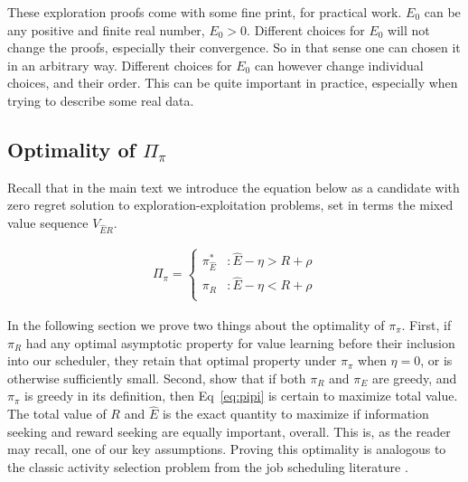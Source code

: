 These exploration proofs come with some fine print, for practical work. $E_0$ can be any positive and finite real number, $E_0 > 0$. Different choices for $E_0$ will not change the proofs, especially their convergence. So in that sense one can chosen it in an arbitrary way. Different choices for $E_0$ can however change individual choices, and their order. This can be quite important in practice, especially when trying to describe some real data.  

\subsection*{Optimality of $\Pi_{\pi}$} 
Recall that in the main text we introduce the equation below as a candidate with zero regret solution to exploration-exploitation problems, set in terms the mixed value sequence $V_{\hat{E}R}$.

\begin{equation} 
    \label{eq:pipi_app}
    \begin{split}
        \Pi_{\pi} = 
        \begin{cases}
            \pi^*_{\hat{E}} & : \hat{E} - \eta > R + \rho \\
            \pi_R 	& : \hat{E} - \eta < R + \rho \\
        \end{cases}
    \end{split}
\end{equation}

In the following section we prove two things about the optimality of $\pi_\pi$. First, if $\pi_R$ had any optimal asymptotic property for value learning before their inclusion into our scheduler, they retain that optimal property under $\pi_\pi$ when $\eta = 0$, or is otherwise sufficiently small. Second, show that if both $\pi_R$ and $\pi_E$ are greedy, and $\pi_\pi$ is greedy in its definition, then Eq~\ref{eq:pipi} is certain to maximize total value. The total value of $R$ and $\hat E$ is the exact quantity to maximize if information seeking and reward seeking are equally important, overall. This is, as the reader may recall, one of our key assumptions. Proving this optimality is analogous to the classic activity selection problem from the job scheduling literature \cite{BellmanBook,Roughgarden2019}.

